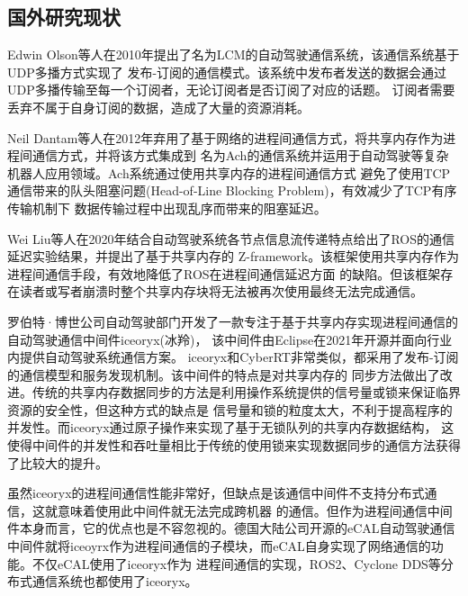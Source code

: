 \subsection{国外研究现状}
Edwin Olson等人在2010年提出了名为LCM\cite{2010LCM}的自动驾驶通信系统，该通信系统基于UDP多播方式实现了
发布-订阅的通信模式。该系统中发布者发送的数据会通过UDP多播传输至每一个订阅者，无论订阅者是否订阅了对应的话题。
订阅者需要丢弃不属于自身订阅的数据，造成了大量的资源消耗。

Neil Dantam等人在2012年弃用了基于网络的进程间通信方式，将共享内存作为进程间通信方式，并将该方式集成到
名为Ach\cite{6651538}的通信系统并运用于自动驾驶等复杂机器人应用领域。Ach系统通过使用共享内存的进程间通信方式
避免了使用TCP通信带来的队头阻塞问题(Head-of-Line Blocking Problem)，有效减少了TCP有序传输机制下
数据传输过程中出现乱序而带来的阻塞延迟\cite{8863328}。

Wei Liu等人在2020年结合自动驾驶系统各节点信息流传递特点给出了ROS的通信延迟实验结果，并提出了基于共享内存的
Z-framework\cite{2020memory}。该框架使用共享内存作为进程间通信手段，有效地降低了ROS在进程间通信延迟方面
的缺陷。但该框架存在读者或写者崩溃时整个共享内存块将无法被再次使用最终无法完成通信。


罗伯特·博世公司自动驾驶部门开发了一款专注于基于共享内存实现进程间通信的自动驾驶通信中间件iceoryx(冰羚)，
该中间件由Eclipse在2021年开源并面向行业内提供自动驾驶系统通信方案。
iceoryx和CyberRT非常类似，都采用了发布-订阅的通信模型和服务发现机制。该中间件的特点是对共享内存的
同步方法做出了改进。传统的共享内存数据同步的方法是利用操作系统提供的信号量或锁来保证临界资源的安全性，但这种方式的缺点是
信号量和锁的粒度太大，不利于提高程序的并发性。而iceoryx通过原子操作来实现了基于无锁队列的共享内存数据结构，
这使得中间件的并发性和吞吐量相比于传统的使用锁来实现数据同步的通信方法获得了比较大的提升\cite{iceoryx}。

虽然iceoryx的进程间通信性能非常好，但缺点是该通信中间件不支持分布式通信，这就意味着使用此中间件就无法完成跨机器
的通信。但作为进程间通信中间件本身而言，它的优点也是不容忽视的。德国大陆公司开源的eCAL自动驾驶通信
中间件就将iceoyrx作为进程间通信的子模块，而eCAL自身实现了网络通信的功能。不仅eCAL使用了iceoryx作为
进程间通信的实现，ROS2、Cyclone DDS等分布式通信系统也都使用了iceoryx\cite{ecal}。


